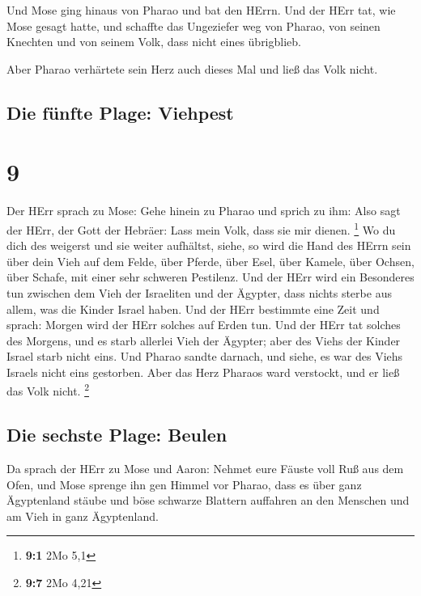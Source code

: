  Und Mose ging hinaus von Pharao und bat den HErrn.
 Und der HErr tat, wie Mose gesagt hatte, und schaffte
das Ungeziefer weg von Pharao, von seinen Knechten und von seinem Volk,
dass nicht eines übrigblieb.

 Aber Pharao verhärtete sein Herz auch dieses Mal und
ließ das Volk nicht.

\hypertarget{die-fuxfcnfte-plage-viehpest}{%
\subsection{Die fünfte Plage:
Viehpest}\label{die-fuxfcnfte-plage-viehpest}}

\hypertarget{section-8}{%
\section{9}\label{section-8}}

 Der HErr sprach zu Mose: Gehe hinein zu Pharao und sprich
zu ihm: Also sagt der HErr, der Gott der Hebräer: Lass mein Volk, dass
sie mir dienen. \footnote{\textbf{9:1} 2Mo 5,1}  Wo du
dich des weigerst und sie weiter aufhältst,  siehe, so
wird die Hand des HErrn sein über dein Vieh auf dem Felde, über Pferde,
über Esel, über Kamele, über Ochsen, über Schafe, mit einer sehr
schweren Pestilenz.  Und der HErr wird ein Besonderes tun
zwischen dem Vieh der Israeliten und der Ägypter, dass nichts sterbe aus
allem, was die Kinder Israel haben.  Und der HErr
bestimmte eine Zeit und sprach: Morgen wird der HErr solches auf Erden
tun.  Und der HErr tat solches des Morgens, und es starb
allerlei Vieh der Ägypter; aber des Viehs der Kinder Israel starb nicht
eins.  Und Pharao sandte darnach, und siehe, es war des
Viehs Israels nicht eins gestorben. Aber das Herz Pharaos ward
verstockt, und er ließ das Volk nicht. \footnote{\textbf{9:7} 2Mo 4,21}

\hypertarget{die-sechste-plage-beulen}{%
\subsection{Die sechste Plage: Beulen}\label{die-sechste-plage-beulen}}

 Da sprach der HErr zu Mose und Aaron: Nehmet eure Fäuste
voll Ruß aus dem Ofen, und Mose sprenge ihn gen Himmel vor Pharao,
 dass es über ganz Ägyptenland stäube und böse schwarze
Blattern auffahren an den Menschen und am Vieh in ganz Ägyptenland.


